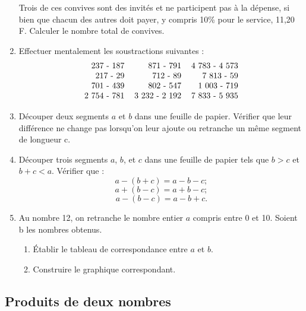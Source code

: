 \documentclass[12 pt]{extarticle}
\theoremstyle{plain}
\begin{document}
\begin{enumerate}
 Trois de ces convives sont des invités et ne participent pas à la dépense,
 si bien que chacun des autres doit payer, y compris 10\% pour le service,
 11,20 F. Calculer le nombre total de convives.
 \item Effectuer mentalement les soustractions suivantes : 
 \[\begin{tabular}{rrr}
 237 - 187 & 871 - 791 & 4~783 - 4~573 \\
 217 - 29 & 712 - 89 & 7~813 - 59 \\
 701 - 439 & 802 - 547 & 1~003 - 719 \\ 
 2~754 - 781 & 3~232 - 2~192 & 7~833 - 5~935
\end{tabular}\]
 
 \item Découper deux segments $a$ et $b$ dans une feuille de papier.
 Vérifier que leur différence ne change pas lorsqu'on leur ajoute ou retranche un même segment de longueur c. 
 
 \item Découper trois segments $a$, $b$, et $c$ dans une feuille de papier tels que $b> c$ et $ b + c < a$. Vérifier que : 
 \[ a - (b+c) = a - b - c;\]
 \[ a + (b - c) = a + b - c ;\]
 \[ a - (b - c) = a - b + c.\] 
 
 \item Au nombre 12, on retranche le nombre entier $a$ compris entre 0 et 10. Soient b les nombres obtenus. 
 \begin{enumerate}
 \item Établir le tableau de correspondance entre $a$ et $b$. 
 \item Construire le graphique correspondant.
 \end{enumerate}
 
 \end{enumerate}
 
 \subsection{Produits de deux nombres}
 
\end{document}
